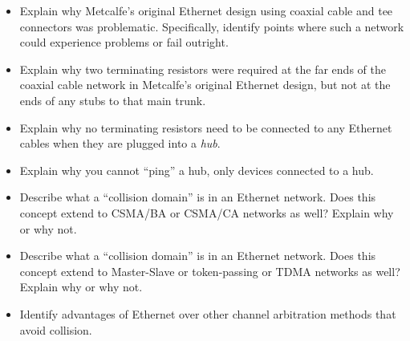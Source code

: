 \begin{itemize}
\item{} Explain why Metcalfe's original Ethernet design using coaxial cable and tee connectors was problematic.  Specifically, identify points where such a network could experience problems or fail outright.
\item{} Explain why two terminating resistors were required at the far ends of the coaxial cable network in Metcalfe's original Ethernet design, but not at the ends of any stubs to that main trunk.
\item{} Explain why no terminating resistors need to be connected to any Ethernet cables when they are plugged into a {\it hub}.
\item{} Explain why you cannot ``ping'' a hub, only devices connected to a hub.
\item{} Describe what a ``collision domain'' is in an Ethernet network.  Does this concept extend to CSMA/BA or CSMA/CA networks as well?  Explain why or why not.
\item{} Describe what a ``collision domain'' is in an Ethernet network.  Does this concept extend to Master-Slave or token-passing or TDMA networks as well?  Explain why or why not.
\item{} Identify advantages of Ethernet over other channel arbitration methods that avoid collision.
\end{itemize}



